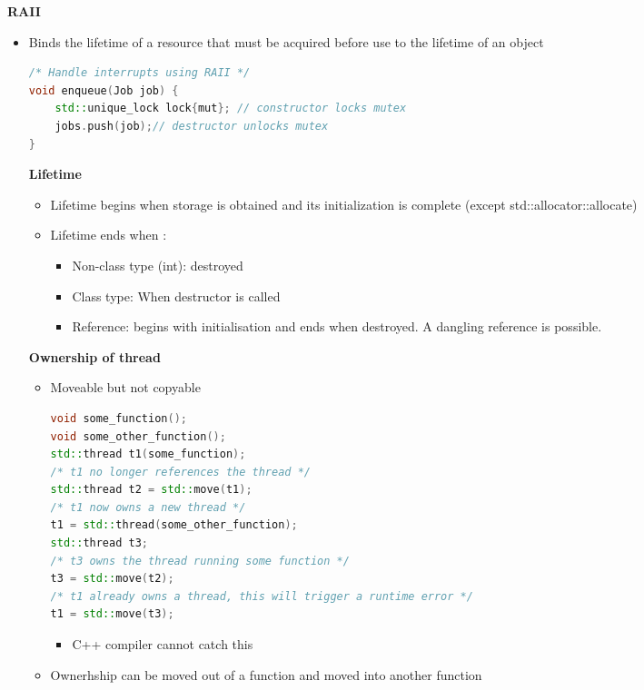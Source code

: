 \documentclass[10pt, landscape]{article}
\begin{document}
\begin{multicols}{4}
\textbf{RAII} \\ 
\begin{itemize}
    \item Binds the lifetime of a resource that must be acquired before use to the lifetime of an object
\begin{lstlisting}[language=C++, breaklines=true, breakatwhitespace=true]
/* Handle interrupts using RAII */
void enqueue(Job job) {
    std::unique_lock lock{mut}; // constructor locks mutex
    jobs.push(job);// destructor unlocks mutex
}
\end{lstlisting}

\textbf{Lifetime} \\
\begin{itemize}
    \item Lifetime begins when storage is obtained and its initialization is complete (except std::allocator::allocate)   
    \item Lifetime ends when :
    \begin{itemize}
        \item Non-class type (int): destroyed
        \item Class type: When destructor is called 
        \item Reference: begins with initialisation and ends when destroyed. A dangling reference is possible.
    \end{itemize}
\end{itemize}

\textbf{Ownership of thread} \\ 
\begin{itemize}
    \item Moveable but not copyable
    \begin{lstlisting}[language=C++, breaklines=true, breakatwhitespace=true]
void some_function();
void some_other_function();
std::thread t1(some_function);
/* t1 no longer references the thread */
std::thread t2 = std::move(t1); 
/* t1 now owns a new thread */
t1 = std::thread(some_other_function);
std::thread t3;
/* t3 owns the thread running some function */
t3 = std::move(t2);
/* t1 already owns a thread, this will trigger a runtime error */
t1 = std::move(t3); 
    \end{lstlisting}
    \begin{itemize}
        \item C++ compiler cannot catch this
    \end{itemize}
    \item Ownerhship can be moved out of a function and moved into another function
    \begin{lstlisting}[language=C++, breaklines=true, breakatwhitespace=true]


\end{lstlisting}
\end{itemize}
\end{itemize}
\end{multicols}
\end{document}
